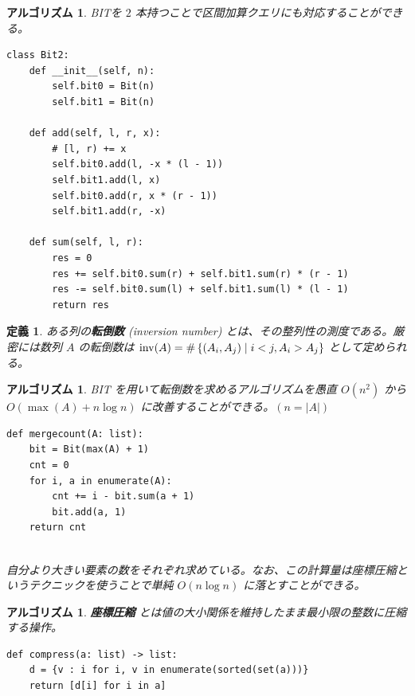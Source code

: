 \documentclass[12pt, a4j]{ltjsarticle}
\newtheorem{defi}[thm]{定義}
\newtheorem{alg}[thm]{アルゴリズム}
\newcommand*{\SS}{\vspace{1cm}}
\begin{document}
\SS

\begin{alg} \upshape BITを $2$ 本持つことで区間加算クエリにも対応することができる。\\
\begin{lstlisting}
class Bit2:
    def __init__(self, n):
        self.bit0 = Bit(n)
        self.bit1 = Bit(n)

    def add(self, l, r, x):
        # [l, r) += x
        self.bit0.add(l, -x * (l - 1))
        self.bit1.add(l, x)
        self.bit0.add(r, x * (r - 1))
        self.bit1.add(r, -x)

    def sum(self, l, r):
        res = 0
        res += self.bit0.sum(r) + self.bit1.sum(r) * (r - 1)
        res -= self.bit0.sum(l) + self.bit1.sum(l) * (l - 1)
        return res
\end{lstlisting}
\end{alg}

\SS

\begin{defi}
ある列の{\bf 転倒数} (inversion number) とは、その整列性の測度である。厳密には数列 $A$ の転倒数は ${\rm inv}(A)=\#\left\{(A_i,A_j)\mid i<j, A_i>A_j\right\}$ として定められる。
\end{defi}
\newpage
\begin{alg} \upshape BIT を用いて転倒数を求めるアルゴリズムを愚直 $O(n^2)$ から $O(\max(A) + n \log n)$ に改善することができる。$(n=|A|)$\\
\begin{lstlisting}
def mergecount(A: list):
    bit = Bit(max(A) + 1)
    cnt = 0
    for i, a in enumerate(A):
        cnt += i - bit.sum(a + 1)
        bit.add(a, 1)
    return cnt
\end{lstlisting}\quad\\
自分より大きい要素の数をそれぞれ求めている。なお、この計算量は座標圧縮というテクニックを使うことで単純 $O(n\log n)$ に落とすことができる。
\end{alg}

\SS

\begin{alg} {\bf 座標圧縮} とは値の大小関係を維持したまま最小限の整数に圧縮する操作。\\\upshape
\begin{lstlisting}
def compress(a: list) -> list:
    d = {v : i for i, v in enumerate(sorted(set(a)))}
    return [d[i] for i in a]
\end{lstlisting}
\end{alg}
\end{document}
